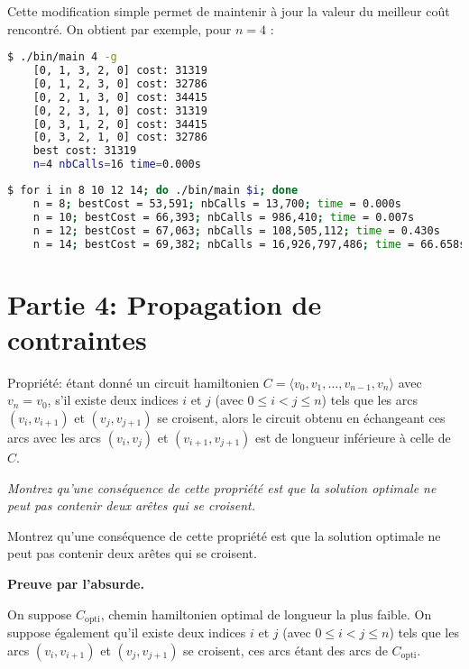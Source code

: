 Cette modification simple permet de maintenir à jour la valeur du meilleur coût rencontré. On obtient par exemple, pour $n = 4$ :

\begin{lstlisting}[language=bash, caption={Exécution de l'algorithme \texttt{permut} pour $n = 4$ avec calcul de la longueur et recherche du plus court chemin}]
    $ ./bin/main 4 -g
    [0, 1, 3, 2, 0] cost: 31319
    [0, 1, 2, 3, 0] cost: 32786
    [0, 2, 1, 3, 0] cost: 34415
    [0, 2, 3, 1, 0] cost: 31319
    [0, 3, 1, 2, 0] cost: 34415
    [0, 3, 2, 1, 0] cost: 32786
    best cost: 31319
    n=4 nbCalls=16 time=0.000s
\end{lstlisting}

\begin{lstlisting}[language=bash, caption={Exécution de l'algorithme \texttt{permut} pour différentes valeurs de $n$.}]
    $ for i in 8 10 12 14; do ./bin/main $i; done
    n = 8; bestCost = 53,591; nbCalls = 13,700; time = 0.000s
    n = 10; bestCost = 66,393; nbCalls = 986,410; time = 0.007s
    n = 12; bestCost = 67,063; nbCalls = 108,505,112; time = 0.430s
    n = 14; bestCost = 69,382; nbCalls = 16,926,797,486; time = 66.658s
\end{lstlisting}

\section{Partie 4: Propagation de contraintes}

Propriété: étant donné un circuit hamiltonien $C = \langle v_0, v_1, \ldots, v_{n-1}, v_n \rangle$ avec $v_n = v_0$, s'il existe deux indices $i$ et $j$ (avec $0 \leq i < j \leq n$) tels que les arcs $(v_i, v_{i+1})$ et $(v_j, v_{j+1})$ se croisent, alors le circuit obtenu en échangeant ces arcs avec les arcs $(v_i, v_j)$ et $(v_{i+1}, v_{j+1})$ est de longueur inférieure à celle de $C$.

\textit{Montrez qu'une conséquence de cette propriété est que la solution optimale ne peut pas contenir deux arêtes qui se croisent.}

Montrez qu'une conséquence de cette propriété est que la solution optimale ne peut pas contenir deux arêtes qui se croisent.

\textbf{Preuve par l'absurde.}

On suppose $C_{\text{opti}}$, chemin hamiltonien optimal de longueur la plus faible. On suppose également qu'il existe deux indices $i$ et $j$ (avec $0 \leq i < j \leq n$) tels que les arcs $(v_i, v_{i+1})$ et $(v_j , v_{j+1})$ se croisent, ces arcs étant des arcs de $C_{\text{opti}}$.

